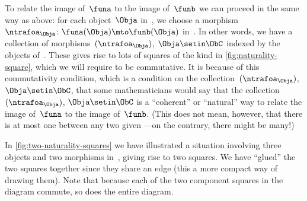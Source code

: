To relate the image of~$\funa$ to the image of~$\funb$ we can proceed in the same way as above: for each object~$\Obja$ in~\CatC, we choose a morphism~$\ntrafoa_\Obja \colon \funa(\Obja) \mto \funb(\Obja)$ in~\CatD.
In other words, we have a collection of morphisms~$(\ntrafoa_\Obja)$, ${\Obja \setin \ObC}$ indexed by the objects of~\CatC.
These gives rise to lots of squares of the kind in \cref{fig:naturality-square}, which we will require to be commutative.
It is because of this commutativity condition, which is a condition on the collection~$(\ntrafoa_\Obja)$, ${\Obja \setin \ObC}$, that some mathematicians would say that the collection~$(\ntrafoa_\Obja)$, ${\Obja \setin \ObC}$ is a ``coherent'' or ``natural'' way to relate the image of~$\funa$ to the image of~$\funb$.
(This does not mean, however, that there is at most one  between any two given ---on the contrary, there might be many!)

\begin{marginfigure}
    \centering
    \caption{}
    \label{fig:two-naturality-squares}
\end{marginfigure}

In \cref{fig:two-naturality-squares} we have illustrated a situation involving three objects and two morphisms in~\CatC, giving rise to two squares.
We have ``glued'' the two squares together since they share an edge (this a more compact way of drawing them).
Note that because each of the two component squares in the diagram commute, so does the entire diagram.


